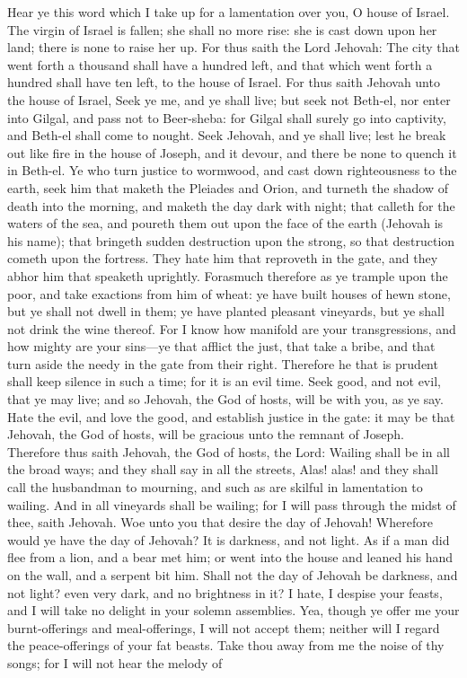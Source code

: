 Hear ye this word which I take up for a lamentation over you, O house of Israel. The virgin of Israel is fallen; she shall no more rise: she is cast down upon her land; there is none to raise her up. For thus saith the Lord Jehovah: The city that went forth a thousand shall have a hundred left, and that which went forth a hundred shall have ten left, to the house of Israel.  For thus saith Jehovah unto the house of Israel, Seek ye me, and ye shall live; but seek not Beth-el, nor enter into Gilgal, and pass not to Beer-sheba: for Gilgal shall surely go into captivity, and Beth-el shall come to nought. Seek Jehovah, and ye shall live; lest he break out like fire in the house of Joseph, and it devour, and there be none to quench it in Beth-el. Ye who turn justice to wormwood, and cast down righteousness to the earth, seek him that maketh the Pleiades and Orion, and turneth the shadow of death into the morning, and maketh the day dark with night; that calleth for the waters of the sea, and poureth them out upon the face of the earth (Jehovah is his name); that bringeth sudden destruction upon the strong, so that destruction cometh upon the fortress.  They hate him that reproveth in the gate, and they abhor him that speaketh uprightly. Forasmuch therefore as ye trample upon the poor, and take exactions from him of wheat: ye have built houses of hewn stone, but ye shall not dwell in them; ye have planted pleasant vineyards, but ye shall not drink the wine thereof. For I know how manifold are your transgressions, and how mighty are your sins—ye that afflict the just, that take a bribe, and that turn aside the needy in the gate from their right. Therefore he that is prudent shall keep silence in such a time; for it is an evil time.  Seek good, and not evil, that ye may live; and so Jehovah, the God of hosts, will be with you, as ye say. Hate the evil, and love the good, and establish justice in the gate: it may be that Jehovah, the God of hosts, will be gracious unto the remnant of Joseph.  Therefore thus saith Jehovah, the God of hosts, the Lord: Wailing shall be in all the broad ways; and they shall say in all the streets, Alas! alas! and they shall call the husbandman to mourning, and such as are skilful in lamentation to wailing. And in all vineyards shall be wailing; for I will pass through the midst of thee, saith Jehovah.  Woe unto you that desire the day of Jehovah! Wherefore would ye have the day of Jehovah? It is darkness, and not light. As if a man did flee from a lion, and a bear met him; or went into the house and leaned his hand on the wall, and a serpent bit him. Shall not the day of Jehovah be darkness, and not light? even very dark, and no brightness in it?  I hate, I despise your feasts, and I will take no delight in your solemn assemblies. Yea, though ye offer me your burnt-offerings and meal-offerings, I will not accept them; neither will I regard the peace-offerings of your fat beasts. Take thou away from me the noise of thy songs; for I will not hear the melody of 